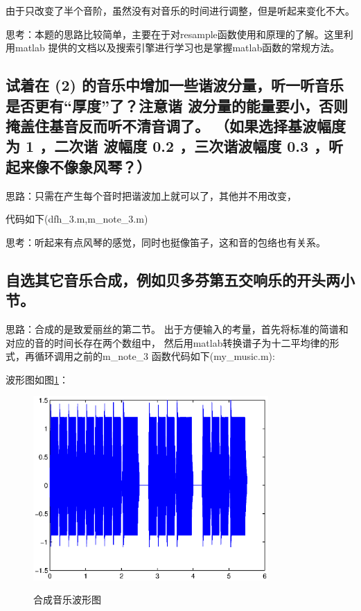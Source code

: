 \documentclass{ctexart}
\begin{document}
        由于只改变了半个音阶，虽然没有对音乐的时间进行调整，但是听起来变化不大。

        思考：本题的思路比较简单，主要在于对resample函数使用和原理的了解。这里利用matlab 提供的文档以及搜索引擎进行学习也是掌握matlab函数的常规方法。

    \subsection{
            试着在 (2) 的音乐中增加一些谐波分量，听一听音乐是否更有“厚度”了？注意谐
            波分量的能量要小，否则掩盖住基音反而听不清音调了。 （如果选择基波幅度为 1 ，二次谐
            波幅度 0.2 ，三次谐波幅度 0.3 ，听起来像不像象风琴？）
        }

        思路：只需在产生每个音时把谐波加上就可以了，其他并不用改变，

				代码如下(dfh\_3.m,m\_note\_3.m)
        
        

        思考：听起来有点风琴的感觉，同时也挺像笛子，这和音的包络也有关系。

    \subsection{
        自选其它音乐合成，例如贝多芬第五交响乐的开头两小节。}

        思路：合成的是致爱丽丝的第二节。
        出于方便输入的考量，首先将标准的简谱和对应的音的时间长存在两个数组中，
        然后用matlab转换谱子为十二平均律的形式，再循环调用之前的m\_note\_3 函数代码如下(my\_music.m):
        

        波形图如图\ref{15}：
        \begin{figure}
            \centering
            \includegraphics[width=0.8\textwidth]{dfh/1_5.eps}\\
            \caption{合成音乐波形图\label{15}}
        \end{figure}
\end{document}
